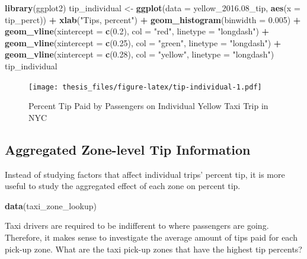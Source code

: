 \documentclass[12pt,twoside]{reedthesis}
\newenvironment{Shaded}{\begin{snugshade}}{\end{snugshade}}
\newcommand{\KeywordTok}[1]{\textcolor[rgb]{0.13,0.29,0.53}{\textbf{#1}}}
\newcommand{\DataTypeTok}[1]{\textcolor[rgb]{0.13,0.29,0.53}{#1}}
\newcommand{\FloatTok}[1]{\textcolor[rgb]{0.00,0.00,0.81}{#1}}
\newcommand{\StringTok}[1]{\textcolor[rgb]{0.31,0.60,0.02}{#1}}
\newcommand{\OperatorTok}[1]{\textcolor[rgb]{0.81,0.36,0.00}{\textbf{#1}}}
\newcommand{\NormalTok}[1]{#1}
\theoremstyle{definition}
\theoremstyle{definition}
\theoremstyle{definition}
\theoremstyle{remark}
\begin{document}
\begin{Shaded}
\begin{Highlighting}[]
\KeywordTok{library}\NormalTok{(ggplot2)}
\NormalTok{tip_individual <-}\StringTok{ }\KeywordTok{ggplot}\NormalTok{(}\DataTypeTok{data =}\NormalTok{ yellow_}\FloatTok{2016.}\NormalTok{08_tip, }
    \KeywordTok{aes}\NormalTok{(}\DataTypeTok{x =}\NormalTok{ tip_perct)) }\OperatorTok{+}\StringTok{ }\KeywordTok{xlab}\NormalTok{(}\StringTok{"Tips, percent"}\NormalTok{) }\OperatorTok{+}\StringTok{ }\KeywordTok{geom_histogram}\NormalTok{(}\DataTypeTok{binwidth =} \FloatTok{0.005}\NormalTok{) }\OperatorTok{+}\StringTok{ }
\StringTok{    }\KeywordTok{geom_vline}\NormalTok{(}\DataTypeTok{xintercept =} \KeywordTok{c}\NormalTok{(}\FloatTok{0.2}\NormalTok{), }\DataTypeTok{col =} \StringTok{"red"}\NormalTok{, }\DataTypeTok{linetype =} \StringTok{"longdash"}\NormalTok{) }\OperatorTok{+}\StringTok{ }
\StringTok{    }\KeywordTok{geom_vline}\NormalTok{(}\DataTypeTok{xintercept =} \KeywordTok{c}\NormalTok{(}\FloatTok{0.25}\NormalTok{), }\DataTypeTok{col =} \StringTok{"green"}\NormalTok{, }
        \DataTypeTok{linetype =} \StringTok{"longdash"}\NormalTok{) }\OperatorTok{+}\StringTok{ }\KeywordTok{geom_vline}\NormalTok{(}\DataTypeTok{xintercept =} \KeywordTok{c}\NormalTok{(}\FloatTok{0.28}\NormalTok{), }
    \DataTypeTok{col =} \StringTok{"yellow"}\NormalTok{, }\DataTypeTok{linetype =} \StringTok{"longdash"}\NormalTok{)}
\NormalTok{tip_individual}
\end{Highlighting}
\end{Shaded}
\begin{figure}
\centering
\texttt{[image: thesis\_files/figure-latex/tip-individual-1.pdf]}
\caption{\label{fig:tip-individual}Percent Tip Paid by Passengers on
Individual Yellow Taxi Trip in NYC}
\end{figure}
\subsection{Aggregated Zone-level Tip
Information}\label{aggregated-zone-level-tip-information}

Instead of studying factors that affect individual trips' percent tip,
it is more useful to study the aggregated effect of each zone on percent
tip.
\begin{Shaded}
\begin{Highlighting}[]
\KeywordTok{data}\NormalTok{(taxi_zone_lookup)}
\end{Highlighting}
\end{Shaded}
Taxi drivers are required to be indifferent to where passengers are
going. Therefore, it makes sense to investigate the average amount of
tips paid for each pick-up zone. What are the taxi pick-up zones that
have the highest tip percents?
\end{document}
